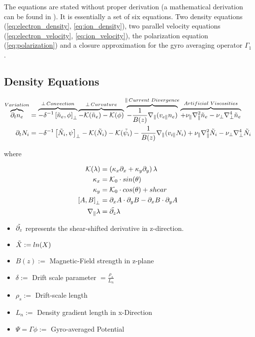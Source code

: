 \documentclass[master.tex]{subfiles}
\begin{document}
The equations are stated without proper derivation (a mathematical derivation can be found in \cite{HeldDisseration}). It is essentially a set of six equations. Two density equations (\autoref{eq:electron_density}, \autoref{eq:ion_density}), two parallel velocity equations (\autoref{eq:electron_velocity}, \autoref{eq:ion_velocity}), the polarization equation (\autoref{eq:polarization}) and a closure approximation for the gyro averaging operator $\Gamma_1$.

\subsection{Density Equations}

\begin{align}
    \overbrace{\partial_t n_e}^{Variation} &=
    \overbrace{-\delta^{-1} \left[\Tilde{n}_e, \phi \right]_{\perp}}^{\perp \, Convection}
    \overbrace{
    - \mathcal{K}(\Tilde{n}_e)
    - \mathcal{K}(\phi)
    }^{\perp \, Curvature}
    \overbrace{
    - \frac{1}{B(z)}\nabla_\parallel (v_{e\parallel} n_e)
    }^{\parallel \, Current\,\, Divergence}
    \overbrace{
    + \nu_\parallel \nabla_\parallel^2\Tilde{n}_e
    - \nu_\perp \nabla^4_\perp\Tilde{n}_e
    }^{Artificial\,\, Viscosities}
    \label{eq:electron_density}
    \\
    \partial_t N_i &=
    -\delta^{-1} \left[\Tilde{N}_i, \psi \right]_{\perp}
    - \mathcal{K}(\Tilde{N}_i)
    - \mathcal{K}(\Tilde{\psi_i})
    - \frac{1}{B(z)}\nabla_\parallel (v_{i\parallel} N_i)
    + \nu_\parallel \nabla_\parallel^2\Tilde{N}_i
    - \nu_\perp \nabla^4_\perp\Tilde{N}_i \label{eq:ion_density}
\end{align}

where

\begin{align}
    \mathcal{K}(\lambda) &= (\kappa_x \partial_x + \kappa_y \partial_y)\,\lambda\\
    \kappa_x &= \mathcal{K}_0 \cdot sin(\theta)\\
    \kappa_y &= \mathcal{K}_0 \cdot cos(\theta) + shear\\
    \left[A, B\right]_\perp &= \partial_x A \cdot \partial_y B - \partial_x B \cdot \partial_y A\\
    \nabla_\parallel \lambda &= \Tilde{\partial_{z}} \lambda
\end{align}
\begin{itemize}
    \item $\Tilde{\partial_{z}}$ represents the shear-shifted derivative in z-direction.
    \item $\Tilde{X} := ln(X)$
    \item $B(z) := $ Magnetic-Field strength in z-plane
    \item $\delta := $ Drift scale parameter $ = \frac{\rho_s}{L_n}$ 
    \item $\rho_s := $ Drift-scale length
    \item $L_n :=$ Density gradient length in x-Direction
    \item $\Psi = \Gamma \phi := $ Gyro-averaged Potential
\end{itemize}
\end{document}

